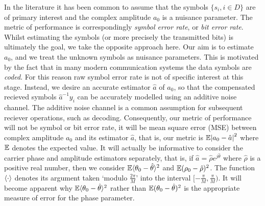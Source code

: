 \documentclass[conference]{IEEEtran}
\begin{document}
In the literature it has been common to assume that the symbols $\{s_i, i \in D\}$ are of primary interest and the complex amplitude $a_0$ is a nuisance parameter.  The metric of performance is correspondingly \emph{symbol error rate}, or \emph{bit error rate}.  Whilst estimating the symbols (or more precisely the transmitted bits) is ultimately the goal, we take the opposite approach here.  Our aim is to estimate $a_0$, and we treat the unknown symbols as nuisance parameters.  This is motivated by the fact that in many modern communication systems the data symbols are \emph{coded}.  For this reason raw symbol error rate is not of specific interest at this stage.  Instead, we desire an accurate estimator $\hat{a}$ of $a_0$, so that the compensated recieved symbols $\hat{a}^{-1}y_i$ can be accurately modelled using an additive noise channel.  The additive noise channel is a common assumption for subsequent reciever operations, such as decoding.  Consequently, our metric of performance will not be symbol or bit error rate, it will be mean square error (MSE) between complex amplitude $a_0$ and its estimator $\hat{a}$, that is, our metric is ${\mathbb E}{\left\vert a_0 - \hat{a} \right\vert}^2$ where ${\mathbb E}$ denotes the expected value. It will actually be informative to consider the carrier phase and amplitude estimators separately, that is, if $\hat{a} = \hat{\rho}e^{j\hat{\theta}}$ where $\hat{\rho}$ is a positive real number, then we consider ${\mathbb E}\langle\theta_0 - \hat{\theta}\rangle^2$ and ${\mathbb E}(\rho_0 - \hat{\rho})^2$.  The function $\left\langle \cdot \right\rangle$ denotes its argument taken `modulo $\tfrac{2\pi}{M}$' into the interval $[-\tfrac{\pi}{M}, \tfrac{\pi}{M})$.  It will become apparent why ${\mathbb E}\langle\theta_0 - \hat{\theta}\rangle^2$ rather than ${\mathbb E}(\theta_0 - \hat{\theta})^2$ is the appropriate measure of error for the phase parameter.

\end{document}
